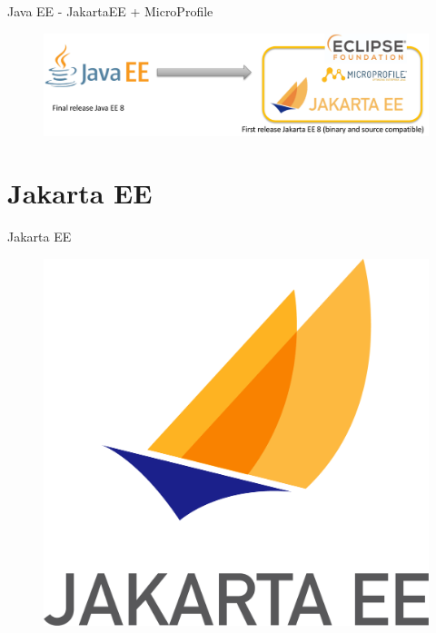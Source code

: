 \documentclass[aspectratio=169]{beamer}
\begin{document}
\begin{frame}{Java EE - JakartaEE + MicroProfile}
\begin{figure}
	\centering
	\includegraphics[width=0.7\linewidth]{Images/javaeeevolution}
\end{figure}
\end{frame}


{
    \section{Jakarta EE}
}

\begin{frame}{Jakarta EE}
\begin{figure}
	\centering
	\includegraphics[width=0.7\linewidth]{Images/jakartaee}
\end{figure}
\end{frame}
\end{document}
